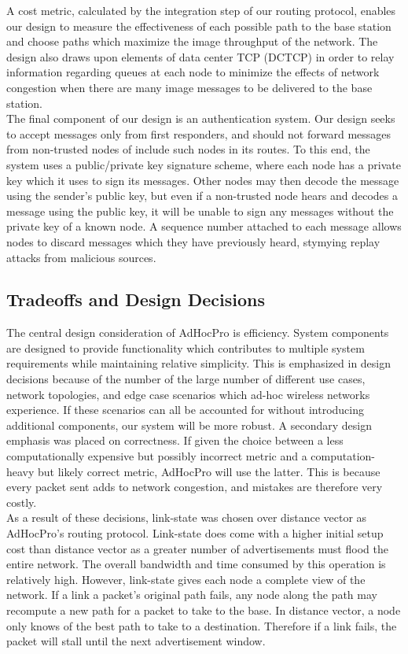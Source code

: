\documentclass[letterpaper]{article}
\begin{document}
\noindent A cost metric, calculated by the integration step of our routing protocol, enables our design to measure
the effectiveness of each possible path to the base station and choose paths which maximize the image 
throughput of the network. The design also draws upon elements of data center TCP (DCTCP) in order to relay 
information regarding queues at each node to minimize the effects of network congestion when there are many
image messages to be delivered to the base station. 
\\

\noindent The final component of our design is an authentication system. Our design seeks to accept messages
only from first responders, and should not forward messages from non-trusted nodes of include such nodes in
its routes. To this end, the system uses a public/private key signature scheme, where each node has a private
key which it uses to sign its messages. Other nodes may then decode the message using the sender's
public key, but even if a non-trusted node hears and decodes a message using the public key, it will be 
unable to sign any messages without the private key of a known node. A sequence number attached to each
message allows nodes to discard messages which they have previously heard, stymying replay attacks from
malicious sources.

\subsection{Tradeoffs and Design Decisions}

The central design consideration of AdHocPro is efficiency. System components are designed to provide
functionality which contributes to multiple system requirements while maintaining relative simplicity.
This is emphasized in design decisions because of the number of the large number of different use cases,
network topologies, and edge case scenarios which ad-hoc wireless networks experience. If these scenarios
can all be accounted for without introducing additional components, our system will be more robust. A 
secondary design emphasis was placed on correctness. If given the choice between a less computationally
expensive but possibly incorrect metric and a computation-heavy but likely correct metric, AdHocPro will
use the latter. This is because every packet sent adds to network congestion, and mistakes are therefore
very costly.
\\

\noindent As a result of these decisions, link-state was chosen over distance vector as AdHocPro's routing
protocol. Link-state does come with a higher initial setup cost than distance vector as a greater number of
advertisements must flood the entire network. The overall bandwidth and time consumed by this operation
is relatively high. However, link-state gives each node a complete view of the network. If a link a packet's
original path fails, any node along the path may recompute a new path for a packet to take to the base. In
distance vector, a node only knows of the best path to take to a destination. Therefore if a link fails, the
packet will stall until the next advertisement window.
\\
\end{document}
